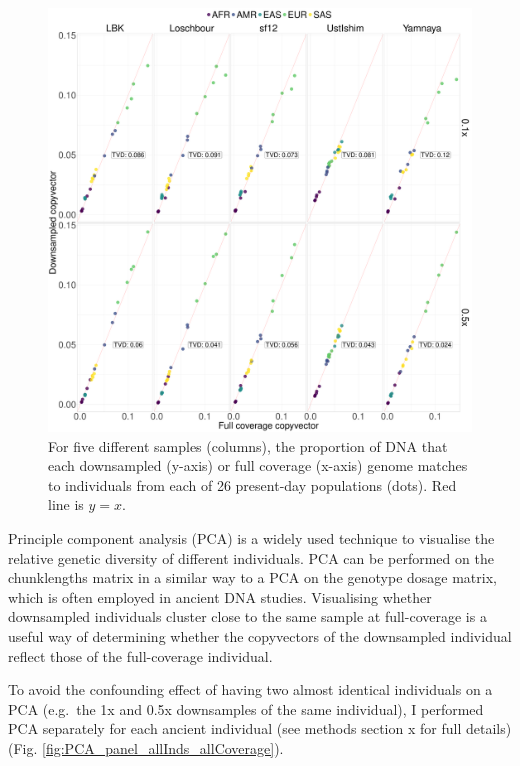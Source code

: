 \begin{figure}[htp]
    \centering
    \includegraphics[width=1.0\textwidth]{../images/chapter1/CP_correlation_allSamples_0.1x_0.5x_30x_moderns.pdf}
    \caption{For five different samples (columns), the proportion of DNA that each downsampled (y-axis) or full coverage (x-axis) genome matches to individuals from each of 26 present-day populations (dots). Red line is $y=x$.}
    \label{fig:CP_correlation_allSamples_0.1x_0.5x_30x_moderns}
\end{figure}

Principle component analysis (PCA) is a widely used technique to visualise the relative genetic diversity of different individuals. PCA can be performed on the chunklengths matrix in a similar way to a PCA on the genotype dosage matrix, which is often employed in ancient DNA studies. Visualising whether downsampled individuals cluster close to the same sample at full-coverage is a useful way of determining whether the copyvectors of the downsampled individual reflect those of the full-coverage individual.

To avoid the confounding effect of having two almost identical individuals on a PCA (e.g.\ the 1x and 0.5x downsamples of the same individual), I performed PCA separately for each ancient individual (see methods section x for full details) (Fig. \ref{fig:PCA_panel_allInds_allCoverage}). 

